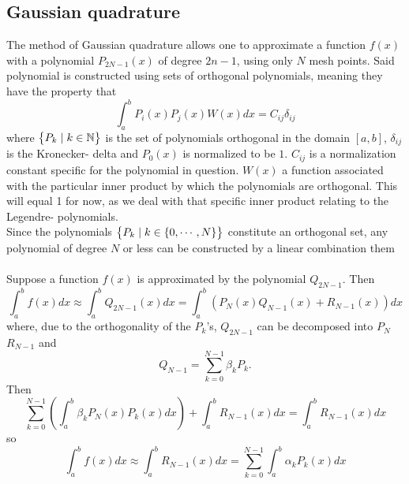 \documentclass[10pt,a4paper]{article}
\begin{document}
\subsection{Gaussian quadrature}\label{Gaussian quadrature}
The method of Gaussian quadrature allows one to approximate a function $f(x)$ with a polynomial $P_{2N-1}(x)$ of degree $2n-1$, using only $N$ mesh points. Said polynomial is constructed using sets of orthogonal polynomials, meaning they have the property that
\begin{equation}
\int_a^b P_i(x)P_j(x)W(x)dx = C_{ij}\delta_{ij}
\end{equation}
where $\big\{ P_k\hspace{1mm}|\hspace{1mm} k \in \mathbb N \big\}$ is the set of polynomials orthogonal in the domain $[a,b]$, $\delta_{ij}$ is the Kronecker- delta and $P_0(x)$ is normalized to be $1$. $C_{ij}$ is a normalization constant specific for the polynomial in question. $W(x)$ a function associated with the particular inner product by which the polynomials are orthogonal. This will equal 1 for now, as we deal with that specific inner product relating to the Legendre- polynomials.\\Since the polynomials $\big\{ P_k\hspace{1mm}|\hspace{1mm} k \in \{0,\cdots ,N\} \big\}$ constitute an orthogonal set, any polynomial of degree $N$ or less can be constructed by a linear combination them\\\\Suppose a function $f(x)$ is approximated by the polynomial $Q_{2N-1}$. Then
\begin{equation}\label{Eq:Poly approximation}
\int_{a}^bf(x)dx \approx \int_{a}^bQ_{2N-1}(x)dx=\int_{a}^b\left(P_N(x)Q_{N-1}(x)+R_{N-1}(x)\right)dx
\end{equation}
where, due to the orthogonality of the $P_k$'s, $Q_{2N-1}$ can be decomposed into $P_N$ $R_{N-1}$ and 
\begin{equation}\label{Eq:orthogonal polynomial expansion}
Q_{N-1} = \sum\limits_{k=0}^{N-1} \beta_k P_k.
\end{equation}
Then
$$
\sum\limits_{k=0}^{N-1} \left( \int_{a}^b \beta_k P_N(x) P_k(x)dx \right)+\int_{a}^bR_{N-1}(x)dx = \int_{a}^bR_{N-1}(x)dx
$$
so
\begin{equation*}
\int_{a}^bf(x)dx \approx \int_{a}^bR_{N-1}(x)dx = \sum\limits_{k=0}^{N-1}  \int_{a}^b \alpha_k P_k(x)dx
\end{equation*}
\end{document}
